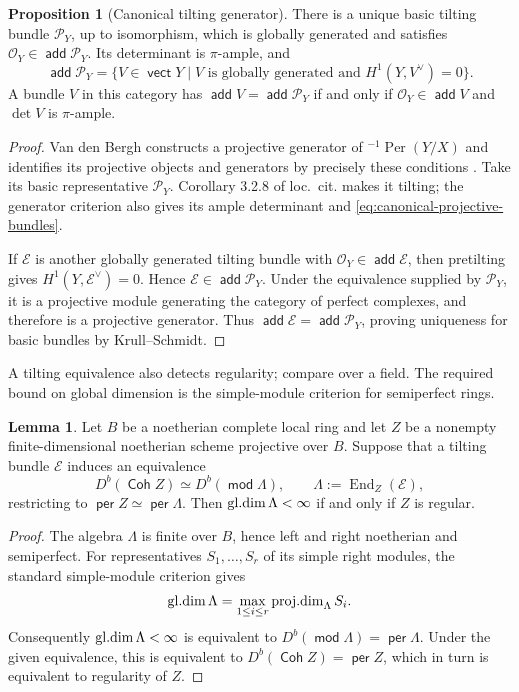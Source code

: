 \documentclass[a4paper,reqno]{amsart}
\def\E{\mathcal{E}}
\def\O{\mathcal{O}}
\def\P{\mathcal{P}}
\DeclareMathOperator{\md}{\mathsf{mod}}
\renewcommand{\mod}{\md}
\DeclareMathOperator{\add}{\mathsf{add}}
\DeclareMathOperator{\Coh}{\mathsf{Coh}}
\DeclareMathOperator{\vect}{\mathsf{vect}}
\DeclareMathOperator{\per}{\mathsf{per}}
\DeclareMathOperator{\End}{End}
\def\gl{\mathop{\rm gl.dim}\nolimits}
\def\pd{\mathop{\rm proj.dim}\nolimits}
\theoremstyle{definition}
\newtheorem{Lem}[Thm]{Lemma}
\newtheorem{Prop}[Thm]{Proposition}
\begin{document}
\begin{Prop}[Canonical tilting generator]\label{prop:canonical-tilting-general}
There is a unique basic tilting bundle $\P_Y$, up to isomorphism, which is globally generated and satisfies $\O_Y\in\add\P_Y$. Its determinant is $\pi$-ample, and
\begin{equation}\label{eq:canonical-projective-bundles}
\add\P_Y
=\{V\in\vect Y\mid V\text{ is globally generated and }H^1(Y,V^\vee)=0\}.
\end{equation}
A bundle $V$ in this category has $\add V=\add\P_Y$ if and only if $\O_Y\in\add V$ and $\det V$ is $\pi$-ample.
\end{Prop}
\begin{proof}
Van den Bergh constructs a projective generator of ${}^{-1}\!\operatorname{Per}(Y/X)$ and identifies its projective objects and generators by precisely these conditions \cite[Propositions 3.2.5--3.2.7]{VdB04b}. Take its basic representative $\P_Y$. Corollary 3.2.8 of loc.\ cit. makes it tilting; the generator criterion also gives its ample determinant and \eqref{eq:canonical-projective-bundles}.

If $\E$ is another globally generated tilting bundle with $\O_Y\in\add\E$, then pretilting gives $H^1(Y,\E^\vee)=0$. Hence $\E\in\add\P_Y$. Under the equivalence supplied by $\P_Y$, it is a projective module generating the category of perfect complexes, and therefore is a projective generator. Thus $\add\E=\add\P_Y$, proving uniqueness for basic bundles by Krull--Schmidt.
\end{proof}

A tilting equivalence also detects regularity; compare \cite[Corollary 4.2(1)]{IW14} over a field. The required bound on global dimension is the simple-module criterion for semiperfect rings.

\begin{Lem}\label{lem:tilting-regularity}
Let $B$ be a noetherian complete local ring and let $Z$ be a nonempty finite-dimensional noetherian scheme projective over $B$. Suppose that a tilting bundle $\E$ induces an equivalence
\[
D^b(\Coh Z)\simeq D^b(\mod\Lambda),\qquad
\Lambda:=\End_Z(\E),
\]
restricting to $\per Z\simeq\per\Lambda$. Then $\gl\Lambda<\infty$ if and only if $Z$ is regular.
\end{Lem}
\begin{proof}
The algebra $\Lambda$ is finite over $B$, hence left and right noetherian and semiperfect. For representatives $S_1,\ldots,S_r$ of its simple right modules, the standard simple-module criterion gives
\[
\gl\Lambda=\max_{1\le i\le r}\pd_\Lambda S_i.
\]
Consequently $\gl\Lambda<\infty$ is equivalent to $D^b(\mod\Lambda)=\per\Lambda$. Under the given equivalence, this is equivalent to $D^b(\Coh Z)=\per Z$, which in turn is equivalent to regularity of $Z$.
\end{proof}
\end{document}
